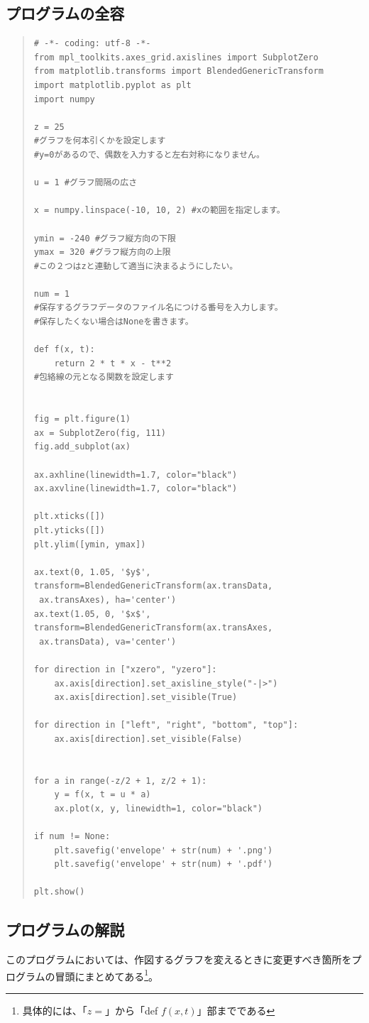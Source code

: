 \documentclass[11pt,a4j]{jarticle}
\begin{document}
\subsection{プログラムの全容}
\begin{quote}
\begin{verbatim}
# -*- coding: utf-8 -*-
from mpl_toolkits.axes_grid.axislines import SubplotZero
from matplotlib.transforms import BlendedGenericTransform
import matplotlib.pyplot as plt
import numpy

z = 25
#グラフを何本引くかを設定します
#y=0があるので、偶数を入力すると左右対称になりません。

u = 1 #グラフ間隔の広さ

x = numpy.linspace(-10, 10, 2) #xの範囲を指定します。

ymin = -240 #グラフ縦方向の下限
ymax = 320 #グラフ縦方向の上限
#この２つはzと連動して適当に決まるようにしたい。

num = 1 
#保存するグラフデータのファイル名につける番号を入力します。
#保存したくない場合はNoneを書きます。

def f(x, t):
    return 2 * t * x - t**2
#包絡線の元となる関数を設定します


fig = plt.figure(1)
ax = SubplotZero(fig, 111)
fig.add_subplot(ax)

ax.axhline(linewidth=1.7, color="black")
ax.axvline(linewidth=1.7, color="black")

plt.xticks([])
plt.yticks([])
plt.ylim([ymin, ymax])

ax.text(0, 1.05, '$y$', transform=BlendedGenericTransform(ax.transData,
 ax.transAxes), ha='center')
ax.text(1.05, 0, '$x$', transform=BlendedGenericTransform(ax.transAxes,
 ax.transData), va='center')

for direction in ["xzero", "yzero"]:
    ax.axis[direction].set_axisline_style("-|>")
    ax.axis[direction].set_visible(True)

for direction in ["left", "right", "bottom", "top"]:
    ax.axis[direction].set_visible(False)

        
for a in range(-z/2 + 1, z/2 + 1):
    y = f(x, t = u * a)
    ax.plot(x, y, linewidth=1, color="black")

if num != None:
    plt.savefig('envelope' + str(num) + '.png')
    plt.savefig('envelope' + str(num) + '.pdf')

plt.show()
\end{verbatim}
\end{quote}
\subsection{プログラムの解説}
このプログラムにおいては、作図するグラフを変えるときに変更すべき箇所をプログラムの冒頭にまとめてある\footnote{具体的には、「$z=$」から「def $f(x,t)$」部までである}。
\end{document}
